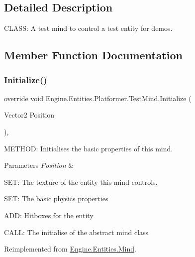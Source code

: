 \subsection{Detailed Description}
C\+L\+A\+SS\+: A test mind to control a test entity for demos. 



\subsection{Member Function Documentation}
\mbox{\label{a00334_ae94a647a0b9c6f1d99abb61e36612ba7}} 
\subsubsection{\texorpdfstring{Initialize()}{Initialize()}}
{\footnotesize\ttfamily override void Engine.\+Entities.\+Platformer.\+Test\+Mind.\+Initialize (\begin{DoxyParamCaption}\item[{Vector2}]{Position }\end{DoxyParamCaption})\hspace{0.3cm}{\ttfamily [inline]}, {\ttfamily [virtual]}}



M\+E\+T\+H\+OD\+: Initialises the basic properties of this mind. 


\begin{DoxyParams}{Parameters}
{\em Position} & \\
\hline
\end{DoxyParams}
S\+ET\+: The texture of the entity this mind controls.

S\+ET\+: The basic physics properties

A\+DD\+: Hitboxes for the entity

C\+A\+LL\+: The initialise of the abstract mind class 

Reimplemented from \hyperlink{a00318_a353d7d2bb1035aefebf0ae3e3f1d1488}{Engine.\+Entities.\+Mind}.

\mbox{\label{a00334_a1817f5df935d637c737d510e39fd251f}} 
